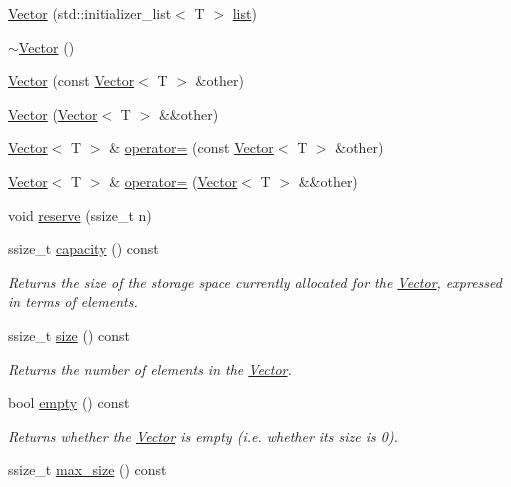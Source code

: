 \begin{DoxyCompactItemize}
\item 
\hyperlink{classVector_a0dba46f864a228e2abde110db8a4e4d8}{Vector} (std\+::initializer\+\_\+list$<$ T $>$ \hyperlink{protocollist-p}{list})
\item 
\hyperlink{classVector_afd524fac19e6d3d69db5198ffe2952b0}{$\sim$\+Vector} ()
\item 
\hyperlink{classVector_ad0ed347210040680329535d7e4d16ae1}{Vector} (const \hyperlink{classVector}{Vector}$<$ T $>$ \&other)
\item 
\hyperlink{classVector_a2694f1fd3e904f3d7b9d387cafa1dafe}{Vector} (\hyperlink{classVector}{Vector}$<$ T $>$ \&\&other)
\item 
\hyperlink{classVector}{Vector}$<$ T $>$ \& \hyperlink{classVector_a9b191182bc58811b1f40a62626d3168d}{operator=} (const \hyperlink{classVector}{Vector}$<$ T $>$ \&other)
\item 
\hyperlink{classVector}{Vector}$<$ T $>$ \& \hyperlink{classVector_ac4cedd399454463a0e9bdf6defd09a04}{operator=} (\hyperlink{classVector}{Vector}$<$ T $>$ \&\&other)
\item 
void \hyperlink{classVector_aebff8698d4672ac51e87d719a15a4a77}{reserve} (ssize\+\_\+t n)
\item 
ssize\+\_\+t \hyperlink{classVector_a83893154a5d9c5cf0f4f12146371212b}{capacity} () const
\begin{DoxyCompactList}\small\item\em Returns the size of the storage space currently allocated for the \hyperlink{classVector}{Vector}, expressed in terms of elements. \end{DoxyCompactList}\item 
ssize\+\_\+t \hyperlink{classVector_a0fee6dcc9febf5495fac43009213bdc8}{size} () const
\begin{DoxyCompactList}\small\item\em Returns the number of elements in the \hyperlink{classVector}{Vector}. \end{DoxyCompactList}\item 
bool \hyperlink{classVector_ad688a8a0dfbd07ea63d838058a436f79}{empty} () const
\begin{DoxyCompactList}\small\item\em Returns whether the \hyperlink{classVector}{Vector} is empty (i.\+e. whether its size is 0). \end{DoxyCompactList}\item 
ssize\+\_\+t \hyperlink{classVector_ab10488a501e7d2073faf8d729fc1d416}{max\+\_\+size} () const
\item 

\end{DoxyCompactItemize}
